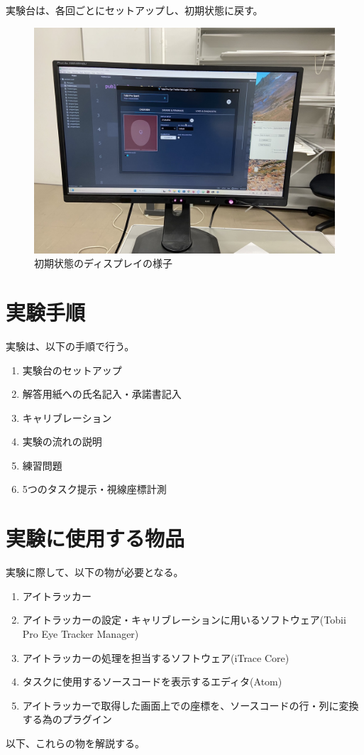 \documentclass[paper=a4paper,fontsize=11pt]{jlreq}
\begin{document}
  実験台は、各回ごとにセットアップし、初期状態に戻す。

  \begin{figure}[h]
    \centering
    \includegraphics[height=0.5\linewidth]{実験台.jpg}
    \caption{初期状態のディスプレイの様子}
  \end{figure}
  

  \section{実験手順}
    実験は、以下の手順で行う。
    \begin{enumerate}
      \item 実験台のセットアップ
      \item 解答用紙への氏名記入・承諾書記入
      \item キャリブレーション
      \item 実験の流れの説明
      \item 練習問題
      \item 5つのタスク提示・視線座標計測
    \end{enumerate}
  

  \section{実験に使用する物品}
    実験に際して、以下の物が必要となる。
    \begin{enumerate}
      \item アイトラッカー
      \item アイトラッカーの設定・キャリブレーションに用いるソフトウェア(Tobii Pro Eye Tracker Manager)
      \item アイトラッカーの処理を担当するソフトウェア(iTrace Core)
      \item タスクに使用するソースコードを表示するエディタ(Atom)
      \item アイトラッカーで取得した画面上での座標を、ソースコードの行・列に変換する為のプラグイン
    \end{enumerate}
    以下、これらの物を解説する。
\end{document}
